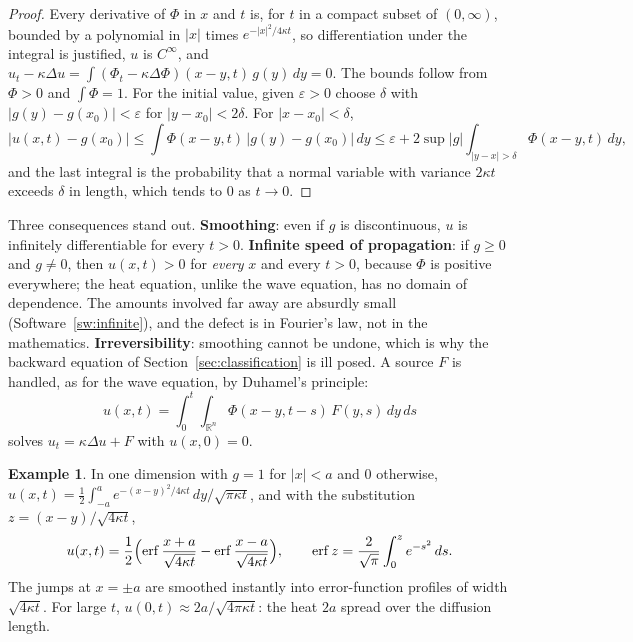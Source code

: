 \documentclass[11pt,a4paper]{article}
\numberwithin{equation}{section}
\theoremstyle{definition}
\newtheorem{exa}[thm]{Example}
\begin{document}
\begin{proof}
Every derivative of $\Phi$ in $x$ and $t$ is, for $t$ in a compact subset of $(0, \infty)$, bounded by a polynomial in $|x|$ times $e^{-|x|^2/4\kappa t}$, so differentiation under the integral is justified, $u$ is $C^\infty$, and $u_t - \kappa\Delta u = \int(\Phi_t - \kappa\Delta\Phi)(x - y, t)\,g(y)\,dy = 0$. The bounds follow
from $\Phi > 0$ and $\int\Phi = 1$. For the initial value, given $\varepsilon > 0$ choose $\delta$ with $|g(y) - g(x_0)| < \varepsilon$ for $|y - x_0| < 2\delta$. For $|x - x_0| < \delta$,
\[
|u(x, t) - g(x_0)| \leq \int\Phi(x - y, t)\,|g(y) - g(x_0)|\,dy \leq \varepsilon + 2\sup|g|\int_{|y - x| > \delta}\Phi(x - y, t)\,dy ,
\]
and the last integral is the probability that a normal variable with variance $2\kappa t$ exceeds $\delta$ in length, which tends to $0$ as $t \to 0$.
\end{proof}

Three consequences stand out. \textbf{Smoothing}: even if $g$ is discontinuous, $u$ is infinitely differentiable for every $t > 0$. \textbf{Infinite speed of propagation}: if $g \geq 0$ and $g \neq 0$, then $u(x, t) > 0$ for \emph{every} $x$ and every $t > 0$, because $\Phi$ is positive everywhere; the
heat equation, unlike the wave equation, has no domain of dependence. The amounts involved far away are absurdly small (Software~\ref{sw:infinite}), and the defect is in Fourier's law, not in the mathematics. \textbf{Irreversibility}: smoothing cannot be undone, which is why the backward equation of
Section~\ref{sec:classification} is ill posed. A source $F$ is handled, as for the wave equation, by Duhamel's principle:
\[
u(x, t) = \int_0^t\!\!\int_{\mathbb R^n}\Phi(x - y, t - s)\,F(y, s)\,dy\,ds
\]
solves $u_t = \kappa\Delta u + F$ with $u(x, 0) = 0$.

\begin{exa}
\label{ex:box}
In one dimension with $g = 1$ for $|x| < a$ and $0$ otherwise, $u(x, t) = \frac12\int_{-a}^a e^{-(x - y)^2/4\kappa t}\,dy/\sqrt{\pi\kappa t}$, and with the substitution $z = (x - y)/\sqrt{4\kappa t}$,
\[
u(x, t) = \frac12\Bigl(\operatorname{erf}\frac{x + a}{\sqrt{4\kappa t}} - \operatorname{erf}\frac{x - a}{\sqrt{4\kappa t}}\Bigr), \qquad \operatorname{erf}z = \frac2{\sqrt\pi}\int_0^ze^{-s^2}\,ds .
\]
The jumps at $x = \pm a$ are smoothed instantly into error-function profiles of width $\sqrt{4\kappa t}$. For large $t$, $u(0, t) \approx 2a/\sqrt{4\pi\kappa t}$: the heat $2a$ spread over the diffusion length.
\end{exa}
\end{document}

